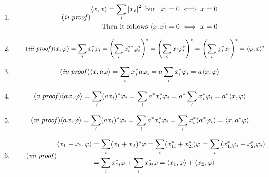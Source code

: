 \documentclass[11pt,letterpaper]{article}%
\newcommand\abs[1]{\left|#1\right|}
\newcommand\inn[2]{\langle#1,#2\rangle}
\begin{document}
\begin{enumerate}[label=\Large{\textbf{\arabic*.}}]
{\begin{enumerate}[label=Proof for \textit{\roman*.}]
\item{
\begin{equation}
\label{inn2p}\tag{\textit{ii proof}}
\begin{split}
\inn{x}{x} = \sum_i \abs{x_i}^2\text{ but } \abs{x} = 0 \iff x = 0 \\
\text{Then it follows }\inn{x}{x} = 0 \iff x = 0
\end{split}
\end{equation}
}

\item{
\begin{equation}
\label{inn3p}\tag{\textit{iii proof}}
\inn{x}{\varphi} = \sum_i x_i^*\varphi_i = \left(\sum_i x_i^{**}\varphi_i^*\right)^* = \left(\sum_i x_i\varphi_i^*\right)^* = \left(\sum_i \varphi_i^*x_i\right)^* = \inn{\varphi}{x}^*
\end{equation}
}

\item{
\begin{equation}
\label{inn4p}\tag{\textit{iv proof}}
\inn{x}{a\varphi} = \sum_i x_i^*a\varphi_i = a\sum_i x_i^*\varphi_i = a\inn{x}{\varphi}
\end{equation}
}

\item{
\begin{equation}
\label{inn5p}\tag{\textit{v proof}}
\inn{ax}{\varphi} = \sum_i (ax_i)^*\varphi_i = \sum_i a^*x_i^*\varphi_i = a^*\sum_i x_i^*\varphi_i = a^*\inn{x}{\varphi}
\end{equation}
}

\item{
\begin{equation}
\label{inn6p}\tag{\textit{vi proof}}
\inn{ax}{\varphi} = \sum_i (ax_i)^*\varphi_i = \sum_i a^*x_i^*\varphi_i = \sum_i x_i^*(a^*\varphi_i) = \inn{x}{a^*\varphi}
\end{equation}
}

\item{
\begin{equation}
\label{inn7p}\tag{\textit{vii proof}}
\begin{split}
\inn{x_1 + x_2}{\varphi} &= \sum_i(x_1 + x_2)^*\varphi = \sum_i(x_{1i}^* + x_{2i}^*)\varphi = \sum_i\left( x_{1i}^*\varphi_i + x_{2i}^*\varphi_i \right)\\
&= \sum_i x_{1i}^*\varphi + \sum_i x_{2i}^*\varphi = \inn{x_1}{\varphi} + \inn{x_2}{\varphi}
\end{split}
\end{equation}
}
\end{enumerate}
\setcounter{equation}{1}
}


\end{enumerate}
\end{document}
